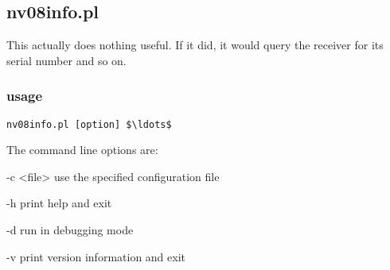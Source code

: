 \subsection{nv08info.pl} \hypertarget{h:nv08info}{}

This actually does nothing useful. If it did, it would query the receiver for its
serial number and so on. 

\subsubsection{usage}

\begin{lstlisting}[mathescape=true]
nv08info.pl [option] $\ldots$ 
\end{lstlisting}

The command line options are:
\begin{description*}
	\item[-c \textless{file}\textgreater] use the specified configuration file
	\item[-h] print help and exit
	\item[-d] run in debugging mode
	\item[-v] print version information and exit
\end{description*}
